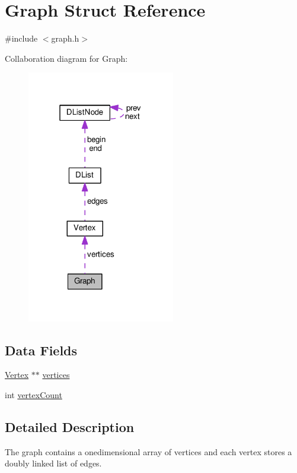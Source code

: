 \hypertarget{structGraph}{}\section{Graph Struct Reference}
\label{structGraph}


{\ttfamily \#include $<$graph.\+h$>$}



Collaboration diagram for Graph\+:\nopagebreak
\begin{figure}[H]
\begin{center}
\leavevmode
\includegraphics[width=183pt]{structGraph__coll__graph}
\end{center}
\end{figure}
\subsection*{Data Fields}
\begin{DoxyCompactItemize}
\item 
\hyperlink{structVertex}{Vertex} $\ast$$\ast$ \hyperlink{structGraph_a78b1f05b8d7d75efa2da1688f7ab4e85}{vertices}
\item 
int \hyperlink{structGraph_aa61a470b538b8c5836ae3f3e6a4dc438}{vertex\+Count}
\end{DoxyCompactItemize}


\subsection{Detailed Description}
The graph contains a onedimensional array of vertices and each vertex stores a doubly linked list of edges. 

